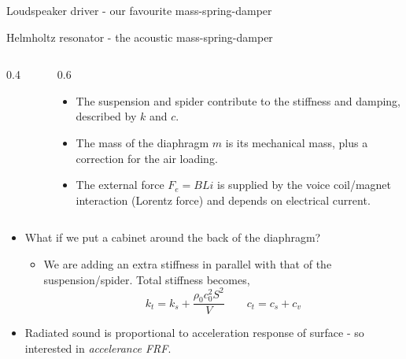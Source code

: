 \documentclass[11pt,aspectratio=169,handout]{beamer}
\begin{document}
\begin{frame}[c]{Loudspeaker driver - our favourite mass-spring-damper}
	\begin{figure}
		\centering
		
	\end{figure}
\end{frame}

\begin{frame}[c]{Helmholtz resonator - the acoustic mass-spring-damper}
	\begin{columns}[T]
		\begin{column}{0.4\textwidth}
			\begin{figure}
				\vspace{-0.4cm}
				\centering
				
			\end{figure}
		\end{column}
		\begin{column}{0.6\textwidth}			
			\begin{itemize}
				\item<1-> The suspension and spider contribute to the stiffness and damping, described by $k$ and $c$. 
				\item<2-> The mass of the diaphragm $m$ is its mechanical mass, plus a correction for the air loading. 
				\item<3-> The external force $F_e = BLi$ is supplied by the voice coil/magnet interaction (Lorentz force) and depends on electrical current.
			\end{itemize}
		\end{column}
	\end{columns}
\vspace{-0.5cm}
	\begin{itemize}
		\item<4-> What if we put a cabinet around the back of the diaphragm? 
		\begin{itemize}
			\item[-] We are adding an extra stiffness in parallel with that of the suspension/spider. Total stiffness becomes,
			\begin{equation}
				k_t = k_s +  \frac{\rho_0c_0^2S^2}{V} \quad \quad c_t = c_s + c_v
			\end{equation}
		\end{itemize}
		\item<5-> Radiated sound is proportional to acceleration response of surface - so interested in \textit{accelerance FRF}.
	\end{itemize}
\end{frame}
\end{document}

